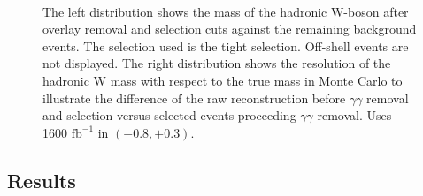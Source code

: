 \begin{figure}
\begin{minipage}{0.50\textwidth}
   
    \end{minipage}\hfill
    \begin{minipage}{0.50\textwidth}
        \centering
    \end{minipage}\\
     \caption{The left distribution shows the  mass of the hadronic W-boson after overlay removal and selection cuts against the remaining background events. The selection used is the tight selection. Off-shell events are not displayed. The right distribution shows the resolution of the hadronic W mass with respect to the true mass in Monte Carlo to illustrate the difference of the raw reconstruction before $\gamma \gamma$ removal and selection versus selected events proceeding $\gamma \gamma$ removal.  Uses 1600 $\text{fb}^{-1}$ in $(-0.8,+0.3)$. 
}
\label{fig:money}
\end{figure}

\subsection{Results}
\label{subsec:wmass}

